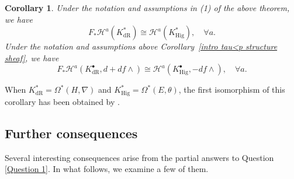 \documentclass[12pt, a4paper]{article}
\newtheorem{corollary}{Corollary}[section]
\begin{document}
\begin{corollary}
Under the notation and assumptions in \textup{(1)} of the above theorem, we have
\[
F_*\mathcal H^a(K^*_{\mathrm{dR}}) \cong \mathcal H^a(K^*_{\mathrm{Hig}}), \quad \forall a.
\]
Under the notation and assumptions above Corollary~\ref{intro tau<p structure sheaf}, we have
\[
F_*\mathcal H^a(K^\bullet_{\mathrm{dR}}, d + df \wedge) \cong \mathcal H^a(K^\bullet_{\mathrm{Hig}}, -df \wedge), \quad \forall a.
\]
\end{corollary}

When \( K^*_{\mathrm{dR}} = \Omega^*(H,\nabla) \) and \( K^*_{\mathrm{Hig}} = \Omega^*(E,\theta) \), the first isomorphism of this corollary has been obtained by \cite{Ogus04}. 

\subsection{Further consequences}
Several interesting consequences arise from the partial answers to Question \ref{Question 1}. In what follows, we examine a few of them. 
\end{document}
